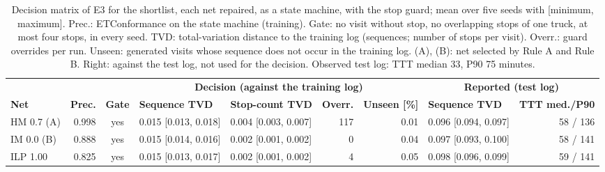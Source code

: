 \begin{table}[htbp]
\centering
\scriptsize
\setlength{\tabcolsep}{2.5pt}
\begin{tabular}{lrcllrr|lr}
\toprule
 & & & \multicolumn{4}{c|}{\textbf{Decision (against the training log)}} & \multicolumn{2}{c}{\textbf{Reported (test log)}} \\
\textbf{Net} & \textbf{Prec.} & \textbf{Gate} & \textbf{Sequence TVD} & \textbf{Stop-count TVD} & \textbf{Overr.} & \textbf{Unseen [\%]} & \textbf{Sequence TVD} & \textbf{TTT med./P90} \\
\midrule
HM 0.7 (A) & 0.998 & yes & 0.015 [0.013, 0.018] & 0.004 [0.003, 0.007] & 117 & 0.01 & 0.096 [0.094, 0.097] & 58 / 136 \\
IM 0.0 (B) & 0.888 & yes & 0.015 [0.014, 0.016] & 0.002 [0.001, 0.002] & 0 & 0.04 & 0.097 [0.093, 0.100] & 58 / 141 \\
ILP 1.00 & 0.825 & yes & 0.015 [0.013, 0.017] & 0.002 [0.001, 0.002] & 4 & 0.05 & 0.098 [0.096, 0.099] & 59 / 141 \\
\bottomrule
\end{tabular}
\caption{Decision matrix of E3 for the shortlist, each net repaired, as a state machine, with the stop guard; mean over five seeds with [minimum, maximum]. Prec.: ETConformance on the state machine (training). Gate: no visit without stop, no overlapping stops of one truck, at most four stops, in every seed. TVD: total-variation distance to the training log (sequences; number of stops per visit). Overr.: guard overrides per run. Unseen: generated visits whose sequence does not occur in the training log. (A), (B): net selected by Rule A and Rule B. Right: against the test log, not used for the decision. Observed test log: TTT median 33, P90 75 minutes.}
\label{tab:rq1_e3_matrix}
\end{table}
